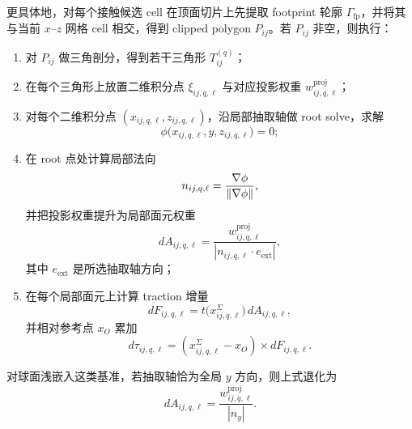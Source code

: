 \documentclass[12pt,a4paper]{ctexart}
\begin{document}
更具体地，对每个接触候选 cell 在顶面切片上先提取 footprint 轮廓 $\Gamma_{\mathrm{fp}}$，并将其与当前 $x$--$z$ 网格 cell 相交，得到 clipped polygon $P_{ij}$。若 $P_{ij}$ 非空，则执行：
\begin{enumerate}
    \item 对 $P_{ij}$ 做三角剖分，得到若干三角形 $T_{ij}^{(q)}$；
    \item 在每个三角形上放置二维积分点 $\xi_{ij,q,\ell}$ 与对应投影权重 $w^{\mathrm{proj}}_{ij,q,\ell}$；
    \item 对每个二维积分点 $(x_{ij,q,\ell},z_{ij,q,\ell})$，沿局部抽取轴做 root solve，求解
    \begin{equation}
        \phi\bigl(x_{ij,q,\ell},y,z_{ij,q,\ell}\bigr)=0;
    \end{equation}
    \item 在 root 点处计算局部法向
    \begin{equation}
        n_{ij,q,\ell}=\frac{\nabla\phi}{\norm{\nabla\phi}},
    \end{equation}
    并把投影权重提升为局部面元权重
    \begin{equation}
        dA_{ij,q,\ell}=\frac{w^{\mathrm{proj}}_{ij,q,\ell}}{|n_{ij,q,\ell}\cdot e_{\mathrm{ext}}|},
    \end{equation}
    其中 $e_{\mathrm{ext}}$ 是所选抽取轴方向；
    \item 在每个局部面元上计算 traction 增量
    \begin{equation}
        dF_{ij,q,\ell}=t\bigl(x_{ij,q,\ell}^{\Sigma}\bigr)\,dA_{ij,q,\ell},
    \end{equation}
    并相对参考点 $x_O$ 累加
    \begin{equation}
        d\tau_{ij,q,\ell}=(x_{ij,q,\ell}^{\Sigma}-x_O)\times dF_{ij,q,\ell}.
    \end{equation}
\end{enumerate}

对球面浅嵌入这类基准，若抽取轴恰为全局 $y$ 方向，则上式退化为
\begin{equation}
    dA_{ij,q,\ell}=\frac{w^{\mathrm{proj}}_{ij,q,\ell}}{|n_y|}.
\end{equation}
\end{document}
